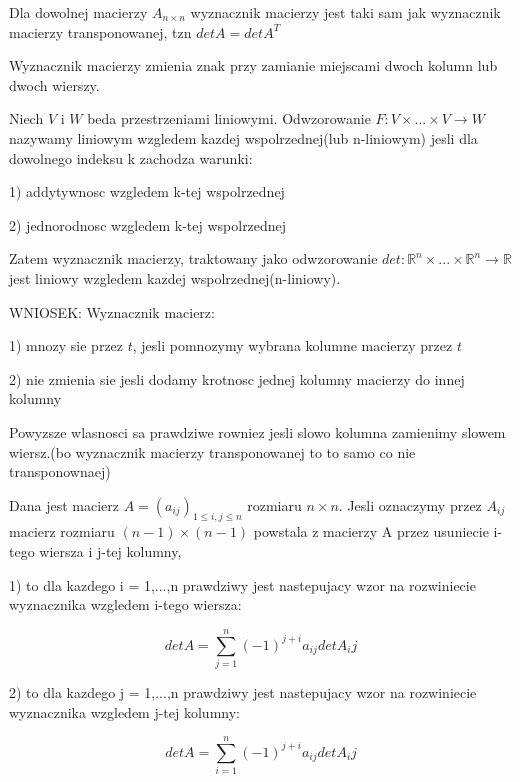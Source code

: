 \documentclass{article}
\begin{document}
\begin{tcolorbox}[colback=white!90!green,colframe=black!35!green,title=Wnioski 2.6-2.7 Wyznacznik macierzy transponowanej i zamiana kolumn wierszy]

Dla dowolnej macierzy $A_{n \times n}$ wyznacznik macierzy jest taki sam jak wyznacznik macierzy transponowanej, tzn $detA = detA^{T}$

Wyznacznik macierzy zmienia znak przy zamianie miejscami dwoch kolumn lub dwoch wierszy.

\end{tcolorbox}

\begin{tcolorbox}[colback=white!90!red,colframe=black!35!red,title=Przeksztalcenie n-liniowe]

Niech $V$ i $W$ beda przestrzeniami liniowymi. Odwzorowanie $F: V \times ... \times V \rightarrow W$ nazywamy liniowym wzgledem kazdej wspolrzednej(lub n-liniowym) jesli dla dowolnego indeksu k zachodza warunki:

1) addytywnosc wzgledem k-tej wspolrzednej

2) jednorodnosc wzgledem k-tej wspolrzednej

Zatem wyznacznik macierzy, traktowany jako odwzorowanie $det: \mathbb{R}^{n} \times ... \times \mathbb{R}^{n} \rightarrow \mathbb{R}$ jest liniowy wzgledem kazdej wspolrzednej(n-liniowy).

WNIOSEK:
Wyznacznik macierz:

1) mnozy sie przez $t$, jesli pomnozymy wybrana kolumne macierzy przez $t$

2) nie zmienia sie jesli dodamy krotnosc jednej kolumny macierzy do innej kolumny

Powyzsze wlasnosci sa prawdziwe rowniez jesli slowo kolumna zamienimy slowem wiersz.(bo wyznacznik macierzy transponowanej to to samo co nie transponownaej)

\end{tcolorbox}


\begin{tcolorbox}[colback=white!90!green,colframe=black!35!green,title=Fakt 2.15 Rozwiniecie Laplace'a]

Dana jest macierz $A = (a_{ij})_{1 \leq i,j \leq n}$ rozmiaru $n \times n$. Jesli oznaczymy przez $A_{ij}$ macierz rozmiaru $(n-1) \times (n-1)$ powstala z macierzy A przez usuniecie i-tego wiersza i j-tej kolumny, 

1) to dla kazdego i = 1,...,n prawdziwy jest nastepujacy wzor na rozwiniecie wyznacznika wzgledem i-tego wiersza:

$$detA =  \sum^{n}_{j=1} (-1)^{j+i}a_{ij}detA_ij $$

2) to dla kazdego j = 1,...,n prawdziwy jest nastepujacy wzor na rozwiniecie wyznacznika wzgledem j-tej kolumny:

$$detA =  \sum^{n}_{i=1} (-1)^{j+i}a_{ij}detA_ij $$

\end{tcolorbox}
\end{document}
